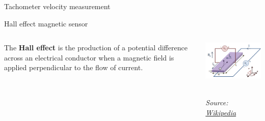 \documentclass[compress]{beamer}
\newcommand{\source}[2]{{\tiny\it Source: \href{#1}{#2}}}
\begin{document}
{
    \begin{frame}{Tachometer velocity measurement}
    \end{frame}
}

\begin{frame}{Hall effect magnetic sensor}

\begin{columns}
    \begin{column}{0.5\linewidth}
         {
            The \textbf{Hall effect} is the production of a potential difference
            across an electrical conductor when a magnetic field is applied
            perpendicular to the flow of current.
        }


    \end{column}
    \begin{column}{0.5\linewidth}
        \begin{center}
            \includegraphics[width=0.8\linewidth]{hall-effect}

             \\
            \source{https://en.wikipedia.org/wiki/Hall_effect}{Wikipedia}

        \end{center}

    \end{column}
\end{columns}
\end{frame}
\end{document}
